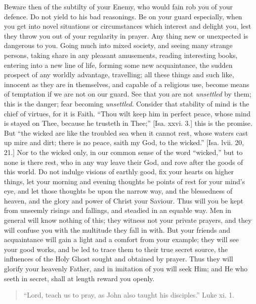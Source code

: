 Beware then of the subtilty of your Enemy, who would
fain rob you of your defence. Do not yield to his bad
reasonings. Be on your guard especially, when you get
into novel situations or circumstances which interest and
delight you, lest they throw you out of your regularity
in prayer. Any thing new or unexpected is dangerous to
you. Going much into mixed society, and seeing many
strange persons, taking share in any pleasant amusements,
reading interesting books, entering into a new line of
life, forming some new acquaintance, the sudden prospect
of any worldly advantage, travelling; all these things
and such like, innocent as they are in themselves, and
capable of a religious use, become means of temptation if
we are not on our guard. See that you are not \emph{unsettled}
by them; this is the danger; fear becoming \emph{unsettled}.
Consider that stability of mind is the chief of virtues,
for it is Faith. ``Thou wilt keep him in perfect
peace, whose mind is stayed on Thee, because he trusteth
in Thee;'' [Isa. xxvi. 3.] this is the promise. But
``the wicked are like the troubled sea when it cannot
rest, whose waters cast up mire and dirt; there is no
peace, saith my God, to the wicked.'' [Isa. lvii. 20,
21.] Nor to the wicked only, in our common sense of the
word ``wicked,'' but to none is there rest, who
in any way leave their God, and rove after the goods of
this world. Do not indulge visions of earthly good, fix
your hearts on higher things, let your morning and
evening thoughts be points of rest for your mind's eye,
and let those thoughts be upon the narrow way, and the
blessedness of heaven, and the glory and power of Christ
your Saviour. Thus will you be kept from unseemly risings
and fallings, and steadied in an equable way. Men in
general will know nothing of this; they witness not your
private prayers, and they will confuse you with the
multitude they fall in with. But your friends and
acquaintance will gain a light and a comfort from your
example; they will see your good works, and be led to
trace them to their true secret source, the influences of
the Holy Ghost sought and obtained by prayer. Thus they
will glorify your heavenly Father, and in imitation of
you will seek Him; and He who seeth in secret, shall at
length reward you openly.


\begin{quote}

``Lord, teach us to pray, as John also taught
his disciples.'' Luke xi. 1.

\end{quote}

